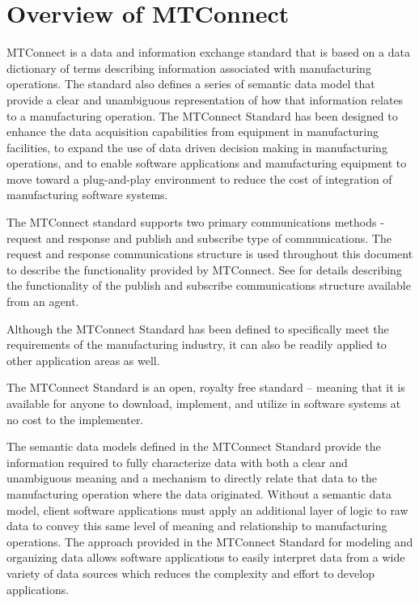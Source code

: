 
\section{Overview of MTConnect}
\label{sec:Overview of MTConnect}

MTConnect is a data and information exchange standard that is based on a \gls{data dictionary} of terms describing information associated with manufacturing operations.  The standard also defines a series of \gls{semantic data model} that provide a clear and unambiguous representation of how that information relates to a manufacturing operation.  The MTConnect Standard has been designed to enhance the data acquisition capabilities from equipment in manufacturing facilities, to expand the use of data driven decision making in manufacturing operations, and to enable software applications and manufacturing equipment to move toward a plug-and-play environment to reduce the cost of integration of manufacturing software systems.

The MTConnect standard supports two primary communications methods - \gls{request and response} and \gls{publish and subscribe} type of communications.  The \gls{request and response} communications structure is used throughout this document to describe the functionality provided by MTConnect.  See  for details describing the functionality of the \gls{publish and subscribe} communications structure available from an \gls{agent}. 

Although the MTConnect Standard has been defined to specifically meet the requirements of the manufacturing industry, it can also be readily applied to other application areas as well.

The MTConnect Standard is an open, royalty free standard – meaning that it is available for anyone to download, implement, and utilize in software systems at no cost to the implementer.

The \glspl{semantic data model} defined in the MTConnect Standard provide the information required to fully characterize data with both a clear and unambiguous meaning and a mechanism to directly relate that data to the manufacturing operation where the data originated.  Without a \gls{semantic data model}, client software applications must apply an additional layer of logic to raw data to convey this same level of meaning and relationship to manufacturing operations.  The approach provided in the MTConnect Standard for modeling and organizing data allows software applications to easily interpret data from a wide variety of data sources which reduces the complexity and effort to develop applications.

